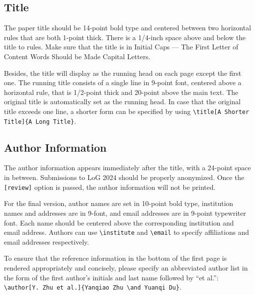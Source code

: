 \documentclass{article}
\begin{document}
\subsection{Title}

The paper title should be 14-point bold type and centered between two horizontal rules that are both 1-point thick.
There is a 1/4-inch space above and below the title to rules.
Make sure that the title is in Initial Caps --- The First Letter of Content Words Should be Made Capital Letters.

Besides, the title will display as the running head on each page except the first one.
The running title consists of a single line in 9-point font, centered above a horizontal rule, that is 1/2-point thick and 20-point above the main text.
The original title is automatically set as the running head.
In case that the original title exceeds one line, a shorter form can be specified by using \verb+\title[A Shorter Title]{A Long Title}+.

\subsection{Author Information}
The author information appears immediately after the title, with a 24-point space in between.
Submissions to LoG 2024 should be properly anonymized.
Once the \verb+[review]+ option is passed, the author information will not be printed.

For the final version, author names are set in 10-point bold type, institution names and addresses are in 9-font, and email addresses are in 9-point typewriter font.
Each name should be centered above the corresponding institution and email address.
Authors can use \verb+\institute+ and \verb+\email+ to specify affiliations and email addresses respectively.

To ensure that the reference information in the bottom of the first page is rendered appropriately and concisely, please specify an abbreviated author list in the form of the first author's initials and last name followed by ``et al.'': \verb+\author[Y. Zhu et al.]{Yanqiao Zhu \and Yuanqi Du}+.
\end{document}
